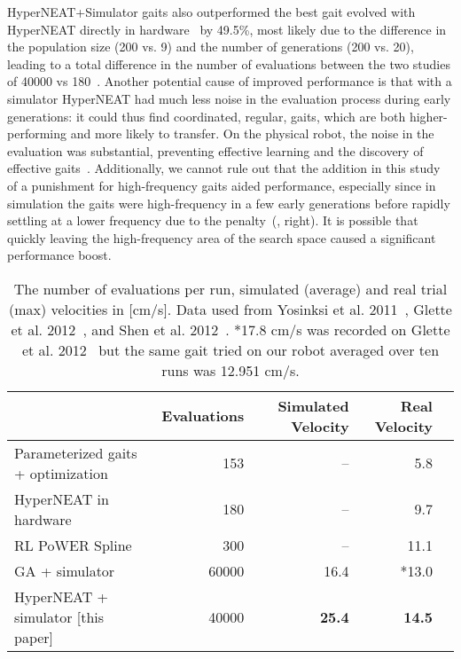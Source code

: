 HyperNEAT+Simulator gaits also outperformed the best gait evolved with HyperNEAT directly in hardware~\cite{yos:clune} by 49.5\%, most likely due to the difference in the population size (200 vs. 9) and the number of generations (200 vs. 20), leading to a total difference in the number of evaluations between the two studies of 40000 vs 180~\cite{yos:clune}. Another potential cause of improved performance is that with a simulator HyperNEAT had much less noise in the evaluation process during early generations: it could thus find coordinated, regular, gaits, which are both higher-performing and more likely to transfer. On the physical robot, the noise in the evaluation was substantial, preventing effective learning and the discovery of effective gaits~\cite{yos:clune}. Additionally, we cannot rule out that the addition in this study of a punishment for high-frequency gaits aided performance, especially since in simulation the gaits were high-frequency in a few early generations before rapidly settling at a lower frequency due to the penalty~(, right). It is possible that quickly leaving the high-frequency area of the search space caused a significant performance boost. 

\begin{table}
\begin{center}
\begin{tabular}{|l|r|r|r|r|}
\hline
                                         & Evaluations  & Simulated Velocity  & Real Velocity \\
\hline
Parameterized gaits + optimization \cite{yos:clune}   &153    & --    & 5.8 \\
\hline
HyperNEAT in hardware \cite{yos:clune}                 & 180         & --         &   9.7     \\
\hline
RL PoWER Spline \cite{haocheng}                         & 300         & --         &   11.1 \\
\hline
GA + simulator \cite{glette}             & 60000       & 16.4       &   *13.0     \\
\hline
HyperNEAT + simulator [this paper]                     & 40000       & \textbf{25.4}       &   \textbf{14.5} \\
\hline
\end{tabular}
\end{center}
\label{resultsTable}
\caption{The number of evaluations per run, simulated (average) and real trial (max) velocities in [cm/s]. Data used from Yosinksi et al. 2011~\cite{yos:clune}, Glette et al. 2012~\cite{glette}, and Shen et al. 2012~\cite{haocheng}.
*17.8 cm/s was recorded on Glette et al. 2012~\cite{glette} but the same gait tried on our robot averaged over ten runs was 12.951 cm/s.}  %
\end{table}

